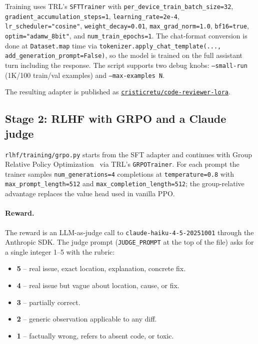 \documentclass[11pt,a4paper]{article}
\newcommand{\code}[1]{\texttt{\small #1}}
\begin{document}
\noindent
Training uses TRL's \code{SFTTrainer} with
\code{per\_device\_train\_batch\_size=32},
\code{gradient\_accumulation\_steps=1}, \code{learning\_rate=2e-4},
\code{lr\_scheduler="cosine"}, \code{weight\_decay=0.01},
\code{max\_grad\_norm=1.0}, \code{bf16=true}, \code{optim="adamw\_8bit"}, and
\code{num\_train\_epochs=1}. The chat-format conversion is done at
\code{Dataset.map} time via \code{tokenizer.apply\_chat\_template(...,
add\_generation\_prompt=False)}, so the model is trained on the full
assistant turn including the response. The script supports two debug knobs:
\code{--small-run} (1K/100 train/val examples) and \code{--max-examples N}.

The resulting adapter is published as
\href{https://huggingface.co/cristicretu/code-reviewer-lora}{\code{cristicretu/code-reviewer-lora}}.

\subsection{Stage 2: RLHF with GRPO and a Claude judge}

\code{rlhf/training/grpo.py} starts from the SFT adapter and continues with
Group Relative Policy Optimization~\cite{shao2024deepseekmath} via TRL's
\code{GRPOTrainer}. For each prompt the trainer samples
\code{num\_generations=4} completions at \code{temperature=0.8} with
\code{max\_prompt\_length=512} and \code{max\_completion\_length=512}; the
group-relative advantage replaces the value head used in vanilla PPO.

\paragraph{Reward.} The reward is an LLM-as-judge call to
\code{claude-haiku-4-5-20251001} through the Anthropic SDK. The judge
prompt (\code{JUDGE\_PROMPT} at the top of the file) asks for a single
integer 1--5 with the rubric:

\begin{itemize}[leftmargin=*,nosep]
  \item \textbf{5} -- real issue, exact location, explanation, concrete fix.
  \item \textbf{4} -- real issue but vague about location, cause, or fix.
  \item \textbf{3} -- partially correct.
  \item \textbf{2} -- generic observation applicable to any diff.
  \item \textbf{1} -- factually wrong, refers to absent code, or toxic.
\end{itemize}
\end{document}
